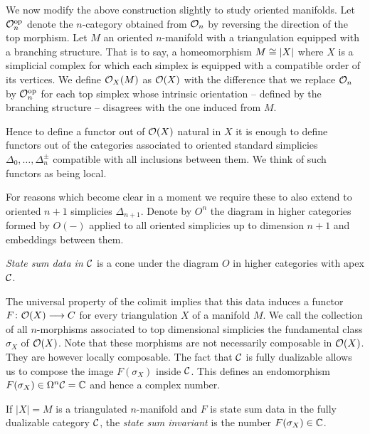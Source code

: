 We now modify the above construction slightly to study oriented manifolds.
Let $\mathcal{O}_n^{\mathrm{op}}$ denote the $n$-category obtained from $\mathcal{O}_n$ by reversing the direction of the top morphism.
Let $M$ an oriented $n$-manifold with a triangulation equipped with a branching structure.
That is to say, a homeomorphism $M \cong \lvert X\rvert$ where $X$ is a simplicial complex for which each simplex is equipped with a compatible order of its vertices.
We define $\mathcal{O}_X(M)$ as $\mathcal{O}(X)$ with the difference that we replace $\mathcal{O}_n$ by $\mathcal{O}_n^{\mathrm{op}}$ for each top simplex whose intrinsic orientation -- defined by the branching structure -- disagrees with the one induced from $M$.

Hence to define a functor out of $\mathcal{O}(X)$ natural in $X$ it is enough to define functors out of the categories associated to oriented standard simplicies $\Delta_0, \dots, \Delta_n^\pm$ compatible with all inclusions between them.
We think of such functors as being local.

For reasons which become clear in a moment we require these to also extend to oriented $n+1$ simplicies $\Delta_{n+1}$.
Denote by $O^n$ the diagram in higher categories formed by $O(-)$ applied to all oriented simplicies up to dimension $n+1$ and embeddings between them.

\begin{definition}
\label{def:statesum}
	\emph{State sum data in $\mathcal{C}$} is a cone under the diagram $O$ in higher categories with apex $\mathcal{C}$.
\end{definition}

The universal property of the colimit implies that this data induces a functor $F \colon \mathcal{O}(X) \longrightarrow C$ for every triangulation $X$ of a manifold $M$.
We call the collection of all $n$-morphisms associated to top dimensional simplicies the fundamental class $\sigma_X$ of $\mathcal{O}(X)$.
Note that these morphisms are not necessarily composable in $\mathcal{O}(X)$.
They are however locally composable.
The fact that $\mathcal{C}$ is fully dualizable
allows us to compose the image $F(\sigma_X)$ inside $\mathcal{C}$.
This defines an endomorphism
$F(\sigma_X)\in \Omega^n\mathcal{C}=\mathbb{C} $ and hence a complex number.

\begin{definition}
    \label{def:statesuminvariant}
If $|X| = M$ is a triangulated $n$-manifold and $F$ is state sum data in the fully dualizable category $\mathcal{C}$, the \emph{state sum invariant} is the number $F(\sigma_X) \in \mathbb{C}$.
\end{definition}

